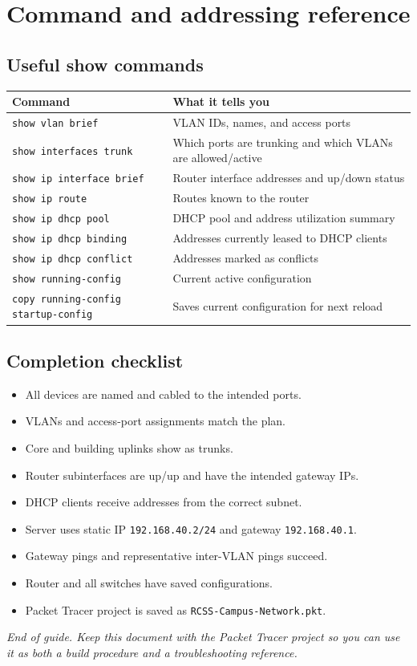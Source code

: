 \documentclass[11pt,a4paper]{article}
\begin{document}
\section{Command and addressing reference}\label{sec:reference}
\subsection*{Useful show commands}
\begin{longtable}{@{}p{}p{}@{}}
\toprule
Command & What it tells you\\
\midrule
\texttt{show vlan brief} & VLAN IDs, names, and access ports\\
\texttt{show interfaces trunk} & Which ports are trunking and which VLANs are allowed/active\\
\texttt{show ip interface brief} & Router interface addresses and up/down status\\
\texttt{show ip route} & Routes known to the router\\
\texttt{show ip dhcp pool} & DHCP pool and address utilization summary\\
\texttt{show ip dhcp binding} & Addresses currently leased to DHCP clients\\
\texttt{show ip dhcp conflict} & Addresses marked as conflicts\\
\texttt{show running-config} & Current active configuration\\
\texttt{copy running-config startup-config} & Saves current configuration for next reload\\
\bottomrule
\end{longtable}

\subsection*{Completion checklist}
\begin{itemize}
\item[$\square$] All devices are named and cabled to the intended ports.
\item[$\square$] VLANs and access-port assignments match the plan.
\item[$\square$] Core and building uplinks show as trunks.
\item[$\square$] Router subinterfaces are up/up and have the intended gateway IPs.
\item[$\square$] DHCP clients receive addresses from the correct subnet.
\item[$\square$] Server uses static IP \texttt{192.168.40.2/24} and gateway \texttt{192.168.40.1}.
\item[$\square$] Gateway pings and representative inter-VLAN pings succeed.
\item[$\square$] Router and all switches have saved configurations.
\item[$\square$] Packet Tracer project is saved as \texttt{RCSS-Campus-Network.pkt}.
\end{itemize}

\vfill
\noindent\textit{End of guide. Keep this document with the Packet Tracer project so you can use it as both a build procedure and a troubleshooting reference.}
\end{document}
